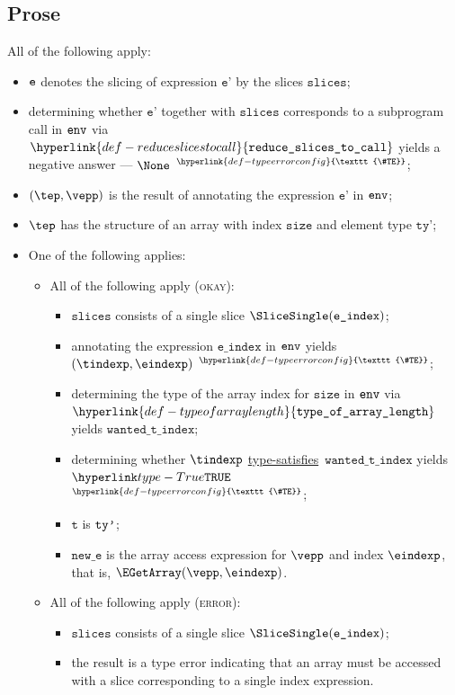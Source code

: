 \documentclass{book}
\newcommand\TypeErrorConfig[0]{\hyperlink{def-typeerrorconfig}{\texttt{\#TE}}}
\newcommand\ProseOrTypeError[0]{\hyperlink{def-proseortypeerror}{$^{\TypeErrorConfig}$}}
\newcommand\typesatisfies[0]{\hyperlink{def-typesatisfies}{type-satisfies}}
\newcommand\reduceslicestocall[0]{\hyperlink{def-reduceslicestocall}{\texttt{reduce\_slices\_to\_call}}}
\newcommand\typeofarraylength[0]{\hyperlink{def-typeofarraylength}{\texttt{type\_of\_array\_length}}}
\newcommand\vt[0]{\texttt{t}}
\newcommand\size[0]{\texttt{size}}
\newcommand\tty[0]{\texttt{ty}}
\newcommand\eindex[0]{\texttt{e\_index}}
\newcommand\wantedtindex[0]{\texttt{wanted\_t\_index}}
\newcommand\slices[0]{\texttt{slices}}
\newcommand\newe[0]{\texttt{new\_e}}
\newcommand\vep[0]{\texttt{e'}}
\begin{document}
\subsection{Prose}
All of the following apply:
\begin{itemize}
  \item $\texttt{e}$ denotes the slicing of expression $\vep$ by the slices $\slices$;
  \item determining whether $\vep$ together with $\slices$ corresponds to a subprogram call
  in $\texttt{env}$ via $\reduceslicestocall$ yields a negative answer --- $\None$ \ProseOrTypeError;
  \item $(\tep,\vepp)$ is the result of annotating the expression $\vep$ in $\texttt{env}$;
  \item $\tep$ has the structure of an array with index $\size$ and element type $\tty$';
  \item One of the following applies:
  \begin{itemize}
    \item All of the following apply (\textsc{okay}):
    \begin{itemize}
      \item $\slices$ consists of a single slice $\SliceSingle(\eindex)$;
      \item annotating the expression $\eindex$ in $\texttt{env}$ yields $(\tindexp, \eindexp)$ \ProseOrTypeError;
      \item determining the type of the array index for $\size$ in $\texttt{env}$ via \\ $\typeofarraylength$
      yields $\wantedtindex$;
      \item determining whether $\tindexp$ \typesatisfies\ $\wantedtindex$ yields $\True$ \ProseOrTypeError;
      \item $\vt$ is $\texttt{ty'}$;
      \item $\newe$ is the array access expression for $\vepp$ and index $\eindexp$, that is, $\EGetArray(\vepp, \eindexp)$.
    \end{itemize}

    \item All of the following apply (\textsc{error}):
    \begin{itemize}
      \item $\slices$ consists of a single slice $\SliceSingle(\eindex)$;
      \item the result is a type error indicating that an array must be accessed with a slice corresponding to a single index
      expression.
    \end{itemize}
  \end{itemize}
\end{itemize}
\end{document}

